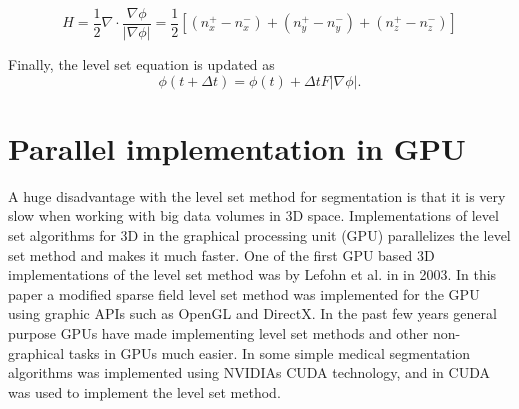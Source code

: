 \begin{equation}
H = \frac{1}{2}\nabla \cdot \frac{\nabla \phi}{|\nabla \phi|} = \frac{1}{2}[(n_x^+ - n_x^-) + (n_y^+ - n_y^-) + (n_z^+ - n_z^-)]
\label{meanCurvature}
\end{equation}

Finally, the level set equation is updated as
\begin{equation}
\phi(t + \Delta t) = \phi(t) + \Delta tF|\nabla \phi|.
\end{equation}

\section{Parallel implementation in GPU}
A huge disadvantage with the level set method for segmentation is that it is very slow when working with big data volumes in 3D space. Implementations of level set algorithms for 3D in the graphical processing unit (GPU) parallelizes the level set method and makes it much faster. One of the first GPU based 3D implementations of the level set method was by Lefohn et al. in \cite{cates03} in 2003. In this paper a modified sparse field level set method was implemented for the GPU using graphic APIs such as OpenGL and DirectX. In the past few years general purpose GPUs have made implementing level set methods and other non-graphical tasks in GPUs much easier. In \cite{panlei08} some simple medical segmentation algorithms was implemented using NVIDIAs CUDA technology, and in \cite{Packer10} CUDA was used to implement the level set method.
